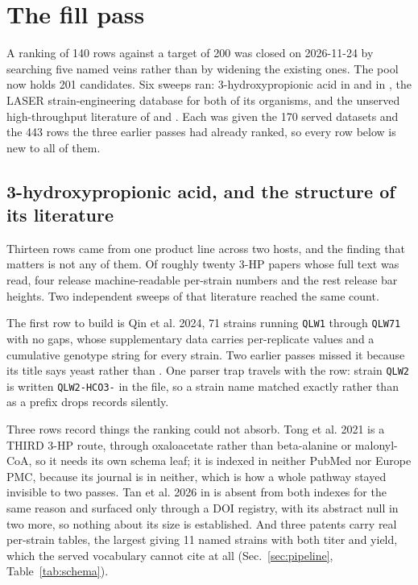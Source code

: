 
\section{The fill pass}\label{sec:fill}

A ranking of 140 rows against a target of 200 was closed on 2026-11-24 by searching five
named veins rather than by widening the existing ones. The pool now holds 201 candidates. Six
sweeps ran: 3-hydroxypropionic acid in  and in , the
LASER strain-engineering database for both of its organisms, and the unserved high-throughput
literature of  and . Each was given the 170 served datasets and
the 443 rows the three earlier passes had already ranked, so every row below is new to all of
them.

\subsection{3-hydroxypropionic acid, and the structure of its literature}\label{sec:fill-3hp}

Thirteen rows came from one product line across two hosts, and the finding that matters is not
any of them. Of roughly twenty  3-HP papers whose full text was read, four
release machine-readable per-strain numbers and the rest release bar heights. Two independent
sweeps of that literature reached the same count.

The first row to build is Qin et al. 2024, 71 strains running \texttt{QLW1} through
\texttt{QLW71} with no gaps, whose supplementary data carries per-replicate values and a
cumulative genotype string for every strain. Two earlier passes missed it because its title
says yeast rather than . One parser trap travels with the row: strain
\texttt{QLW2} is written \texttt{QLW2-HCO3-} in the file, so a strain name matched exactly
rather than as a prefix drops records silently.

Three rows record things the ranking could not absorb. Tong et al. 2021 is a THIRD 3-HP route,
through oxaloacetate rather than beta-alanine or malonyl-CoA, so it needs its own schema leaf;
it is indexed in neither PubMed nor Europe PMC, because its journal is in neither, which is how
a whole pathway stayed invisible to two passes. Tan et al. 2026 in  is
absent from both indexes for the same reason and surfaced only through a DOI registry, with its
abstract null in two more, so nothing about its size is established. And three patents carry
real per-strain tables, the largest giving 11 named strains with both titer and yield, which
the served vocabulary cannot cite at all (Sec.~\ref{sec:pipeline}, Table~\ref{tab:schema}).

